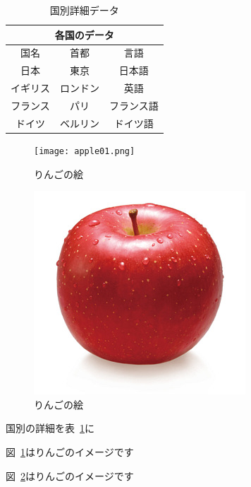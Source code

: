 \documentclass[a4j]{jarticle}
\begin{document}
\begin{table}[htb]
  \caption{国別詳細データ}\label{kuni-data}
  \begin{center}
    \begin{tabular}{|c|c|c|}
      \hline
      \multicolumn{3}{|c|}{各国のデータ} \\
      \hline
        国名 & 首都 & 言語 \\
      \hline
      日本 & 東京 & 日本語 \\
      \hline
      イギリス & ロンドン & 英語 \\ 
      \hline
      フランス & パリ & フランス語 \\ 
      \hline
      ドイツ & ベルリン & ドイツ語 \\
      \hline
    \end{tabular}
  \end{center}
\end{table}
\begin{figure}[htb]
  \begin{center}
    \texttt{[image: apple01.png]}
    \caption{りんごの絵}\label{apple-pic}
  \end{center}
\end{figure}
\begin{figure}[htb]
  \begin{center}
    \includegraphics[scale=0.5]{apple02.jpg}
    \caption{りんごの絵}\label{apple-pic-2}
  \end{center}
\end{figure}

国別の詳細を表~\ref{kuni-data}に\newline

図~\ref{apple-pic}はりんごのイメージです

図~\ref{apple-pic-2}はりんごのイメージです
\end{document}
